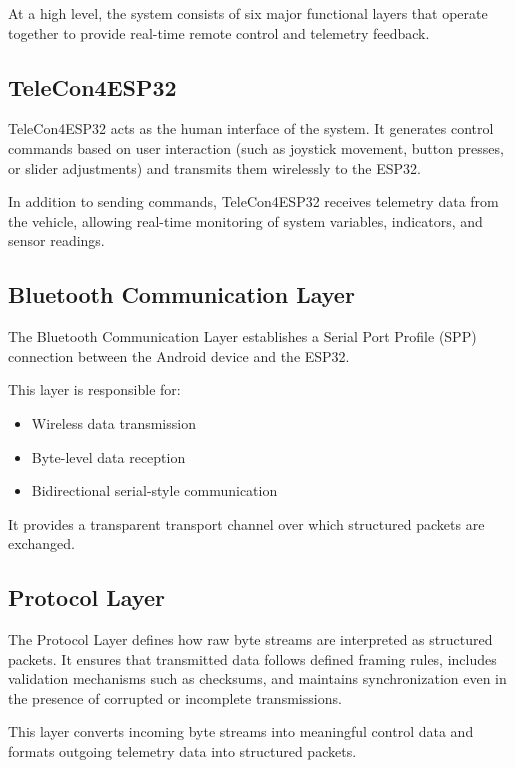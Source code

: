 At a high level, the system consists of six major functional layers that operate together to provide real-time remote control and telemetry feedback.

\subsection{TeleCon4ESP32}

TeleCon4ESP32 acts as the human interface of the system. It generates control commands based on user interaction (such as joystick movement, button presses, or slider adjustments) and transmits them wirelessly to the ESP32.

In addition to sending commands, TeleCon4ESP32 receives telemetry data from the vehicle, allowing real-time monitoring of system variables, indicators, and sensor readings.

\subsection{Bluetooth Communication Layer}

The Bluetooth Communication Layer establishes a Serial Port Profile (SPP) connection between the Android device and the ESP32.

This layer is responsible for:

\begin{itemize}
	\item Wireless data transmission
	\item Byte-level data reception
	\item Bidirectional serial-style communication
\end{itemize}

It provides a transparent transport channel over which structured packets are exchanged.

\subsection{Protocol Layer}

The Protocol Layer defines how raw byte streams are interpreted as structured packets. It ensures that transmitted data follows defined framing rules, includes validation mechanisms such as checksums, and maintains synchronization even in the presence of corrupted or incomplete transmissions.

This layer converts incoming byte streams into meaningful control data and formats outgoing telemetry data into structured packets.

